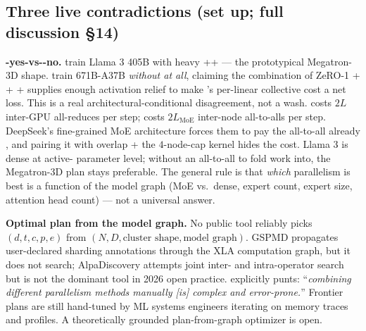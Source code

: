 \subsection{Three live contradictions (set up; full discussion §14)}
\label{sec:dt-contradictions}

\begin{contradiction}
\textbf{-yes-vs--no.} \citet{meta-llama3} train Llama 3 405B with
heavy ++ --- the prototypical Megatron-3D shape. \citet{deepseek-v3}
train  671B-A37B \emph{without  at all}, claiming the
combination of ZeRO-1  +  +  +  supplies enough
activation relief to make 's per-linear collective cost a net loss.
This is a real architectural-conditional disagreement, not a wash. 
costs $2L$ inter-GPU all-reduces per step;  costs $2L_{\text{MoE}}$
inter-node all-to-alls per step. DeepSeek's fine-grained MoE
architecture forces them to pay the  all-to-all already
\citep[\S 3.2]{deepseek-v3}, and pairing it with  overlap +
the $4$-node-cap kernel hides the cost. Llama 3 is dense at active-
parameter level; without an  all-to-all to fold  work into, the
Megatron-3D plan stays preferable. The general rule is that
\emph{which} parallelism is best is a function of the model graph
(MoE vs.\ dense, expert count, expert size, attention head count) ---
not a universal answer.
\end{contradiction}

\begin{contradiction}
\textbf{Optimal plan from the model graph.} No public tool reliably
picks $(d, t, c, p, e)$ from $(N, D, \text{cluster shape}, \text{model
graph})$. GSPMD propagates user-declared sharding annotations through
the XLA computation graph, but it does not search; AlpaDiscovery
attempts joint inter- and intra-operator search but is not the
dominant tool in 2026 open practice. \citet[\S 1]{torchtitan2024}
explicitly punts: ``\emph{combining different parallelism methods
manually [is] complex and error-prone.}'' Frontier plans are still
hand-tuned by ML systems engineers iterating on memory traces and 
profiles. A theoretically grounded plan-from-graph optimizer is open.
\end{contradiction}

